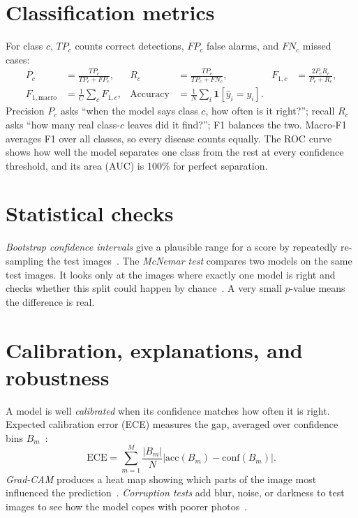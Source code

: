\section{Classification metrics}
For class $c$, $TP_c$ counts correct detections, $FP_c$ false alarms, and $FN_c$ missed cases:
\begin{align}
P_c&=\frac{TP_c}{TP_c+FP_c}, & R_c&=\frac{TP_c}{TP_c+FN_c}, & F_{1,c}&=\frac{2P_cR_c}{P_c+R_c},\\
F_{1,\mathrm{macro}}&=\frac{1}{C}\sum_cF_{1,c}, & \mathrm{Accuracy}&=\frac{1}{N}\sum_i\mathbf1[\hat y_i=y_i].
\end{align}
Precision $P_c$ asks ``when the model says class $c$, how often is it right?''; recall $R_c$ asks ``how many real class-$c$ leaves did it find?''; F1 balances the two. Macro-F1 averages F1 over all classes, so every disease counts equally. The ROC curve shows how well the model separates one class from the rest at every confidence threshold, and its area (AUC) is 100\% for perfect separation.

\section{Statistical checks}
\emph{Bootstrap confidence intervals} give a plausible range for a score by repeatedly re-sampling the test images~\cite{efron1979bootstrap}. The \emph{McNemar test} compares two models on the same test images. It looks only at the images where exactly one model is right and checks whether this split could happen by chance~\cite{dietterich1998tests}. A very small $p$-value means the difference is real.

\section{Calibration, explanations, and robustness}
A model is well \emph{calibrated} when its confidence matches how often it is right. Expected calibration error (ECE) measures the gap, averaged over confidence bins $B_m$~\cite{guo2017calibration}:
\begin{equation}
\mathrm{ECE}=\sum_{m=1}^{M}\frac{|B_m|}{N}\left|\mathrm{acc}(B_m)-\mathrm{conf}(B_m)\right|.
\end{equation}
\emph{Grad-CAM} produces a heat map showing which parts of the image most influenced the prediction~\cite{selvaraju2017gradcam}. \emph{Corruption tests} add blur, noise, or darkness to test images to see how the model copes with poorer photos~\cite{hendrycks2019corruptions}.
